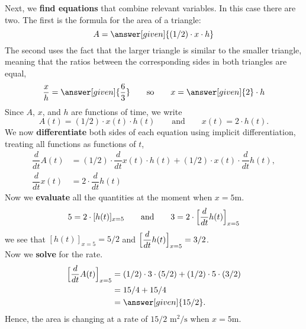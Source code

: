 \documentclass{ximera}
\begin{document}
\begin{example}
\begin{explanation}
    Next, we \textbf{find equations} that combine relevant
    variables. In this case there are two. The first is the formula
    for the area of a triangle:
    \[
    A = \answer[given]{(1/2) \cdot x \cdot h}
    \]
    The second uses the fact that the larger triangle is similar to
    the smaller triangle, meaning that the ratios between the corresponding sides in both triangles
    are equal,
    \[
    \frac{x}{h} = \answer[given]{\frac{6}{3}}\qquad\text{so}\qquad x =
    \answer[given]{2}\cdot h
    \]
   Since $A$, $x$, and $h$ are functions of time, we write
    \[
    A(t) = (1/2) \cdot x(t) \cdot h(t) \qquad\text{and}\qquad x(t) =
    2\cdot h(t).
    \]
    We now  \textbf{differentiate} both sides of each equation using
    implicit differentiation, treating all functions as functions of
    $t$,
    \begin{align*}
    \dfrac{d}{dt}A(t) &= (1/2) \cdot\dfrac{d}{dt}x(t) \cdot h(t) +  (1/2) \cdot x(t) \cdot \dfrac{d}{dt}h(t),\\
     \dfrac{d}{dt}x(t) &= 2\cdot\dfrac{d}{dt}h(t)
    \end{align*}
    Now we \textbf{evaluate} all the quantities at the moment when $x=5$m.
    \[
    5 = 2\cdot [h(t)]_{x=5}\qquad\text{and}\qquad 3= 2\cdot \Bigl[\dfrac{d}{dt}h(t)\Bigr]_{x=5}
    \]
    we see that $ [h(t)]_{x=5} = 5/2$ and $ \Bigl[\dfrac{d}{dt}h(t)\Bigr]_{x=5} = 3/2$. \\
    Now we \textbf{solve} for the rate.
    \begin{align*}
    \Bigl[\dfrac{d}{dt}A(t)\Bigr]_{x=5}  &= (1/2) \cdot 3 \cdot (5/2) + (1/2) \cdot 5 \cdot (3/2)\\
      &= 15/4 + 15/4\\
      &= \answer[given]{15/2}.
    \end{align*}
    Hence, the area is changing at a rate of $15/2$ $\text{m}^2/\text{s}$ when $x=5$m.
    
  \end{explanation}
\end{example}
\end{document}
